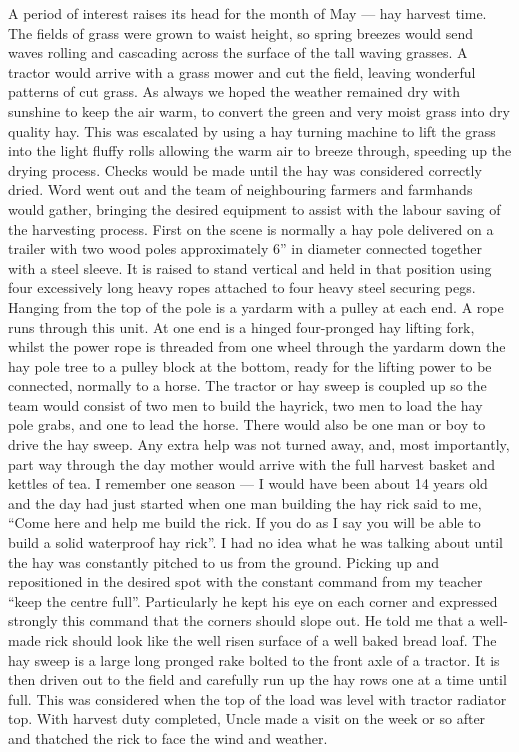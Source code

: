 A period of interest raises its head for the month of May --- hay harvest time.
The fields of grass were grown to waist height, so spring breezes would send
waves rolling and cascading across the surface of the tall waving grasses. A
tractor would arrive with a grass mower and cut the field, leaving wonderful
patterns of cut grass. As always we hoped the weather remained dry with
sunshine to keep the air warm, to convert the green and very moist grass into
dry quality hay. This was escalated by using a hay turning machine to lift the
grass into the light fluffy rolls allowing the warm air to breeze through,
speeding up the drying process. Checks would be made until the hay was
considered correctly dried. Word went out and the team of neighbouring farmers
and farmhands would gather, bringing the desired equipment to assist with the
labour saving of the harvesting process. First on the scene is normally a hay
pole delivered on a trailer with two wood poles approximately 6'' in diameter
connected together with a steel sleeve. It is raised to stand vertical and held
in that position using four excessively long heavy ropes attached to four heavy
steel securing pegs. Hanging from the top of the pole is a yardarm with a
pulley at each end. A rope runs through this unit. At one end is a hinged
four-pronged hay lifting fork, whilst the power rope is threaded from one wheel
through the yardarm down the hay pole tree to a pulley block at the bottom,
ready for the lifting power to be connected, normally to a horse. The tractor
or hay sweep is coupled up so the team would consist of two men to build the
hayrick, two men to load the hay pole grabs, and one to lead the horse. There
would also be one man or boy to drive the hay sweep. Any extra help was not
turned away, and, most importantly, part way through the day mother would
arrive with the full harvest basket and kettles of tea. I remember one
season --- I would have been about 14 years old and the day had just started
when one man building the hay rick said to me, ``Come here and help me build
the rick. If you do as I say you will be able to build a solid waterproof hay
rick''. I had no idea what he was talking about until the hay was constantly
pitched to us from the ground. Picking up and repositioned in the desired spot
with the constant command from my teacher ``keep the centre full''.
Particularly he kept his eye on each corner and expressed strongly this command
that the corners should slope out. He told me that a well-made rick should look
like the well risen surface of a well baked bread loaf. The hay sweep is a
large long pronged rake bolted to the front axle of a tractor. It is then
driven out to the field and carefully run up the hay rows one at a time until
full. This was considered when the top of the load was level with tractor
radiator top. With harvest duty completed, Uncle made a visit on the week or so
after and thatched the rick to face the wind and weather.

